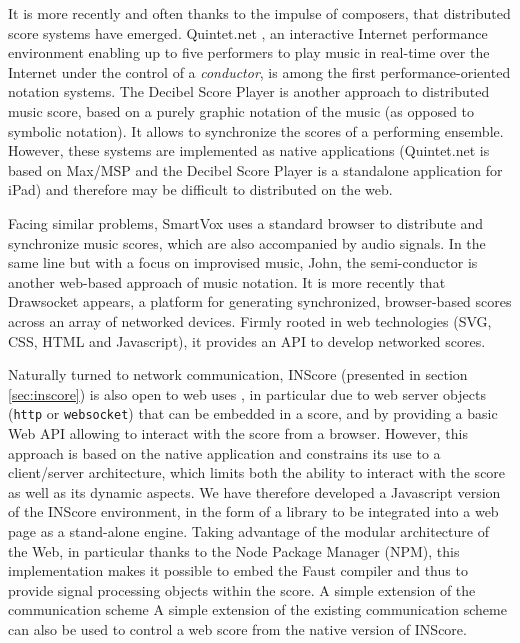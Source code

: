 \documentclass{article}
\newcommand{\icode}[1]	{\texttt{#1}}
\begin{document}
It is more recently and often thanks to the impulse of composers, that distributed score systems have emerged.
Quintet.net \cite{doi:10.1162/leon.2005.38.1.23}, an interactive Internet performance environment enabling up to five performers to play music in real-time over the Internet under the control of a \emph{conductor}, is among the first performance-oriented notation systems. 
The Decibel Score Player \cite{Hope_tenor2015} is another approach to distributed music score, based on a purely graphic notation of the music (as opposed to symbolic notation). It allows to synchronize the scores of a performing ensemble.
However, these systems are implemented as native applications (Quintet.net is based on Max/MSP and the Decibel Score Player is a standalone application for iPad) and therefore may be difficult to distributed on the web.

Facing similar problems, SmartVox \cite{bell:hal-01660184} uses a standard browser to distribute and synchronize music scores, which are also accompanied by audio signals. In the same line but with a focus on improvised music, John, the semi-conductor\cite{goudard:hal-01923258} is another web-based approach of music notation.
It is more recently that Drawsocket \cite{Gottfried_tenor2019} appears, a platform for generating synchronized, browser-based scores across an array of networked devices. Firmly rooted in web technologies (SVG, CSS, HTML and Javascript), it provides an API to develop networked scores.

Naturally turned to network communication, INScore \cite{Fober:12a} (presented in section \ref{sec:inscore}) is also open to web uses \cite{Fober:15b}, in particular due to web server objects (\icode{http} or \icode{websocket}) that can be embedded in a score, and by providing a basic Web API allowing to interact with the score from a browser. 
However, this approach is based on the native application and constrains its use to a client/server architecture, which limits both the ability to interact with the score as well as its dynamic aspects. 
We have therefore developed a Javascript version of the INScore environment, in the form of a library to be integrated into a web page as a stand-alone engine. 
Taking advantage of the modular architecture of the Web, in particular thanks to the Node Package Manager (NPM), this implementation makes it possible to embed the Faust compiler \cite{orlarey:hal-02159014} \cite{ren:hal-03087763} and thus to provide signal processing objects within the score. A simple extension of the communication scheme 
A simple extension of the existing communication scheme can also be used to control a web score from the native version of INScore.
\end{document}
